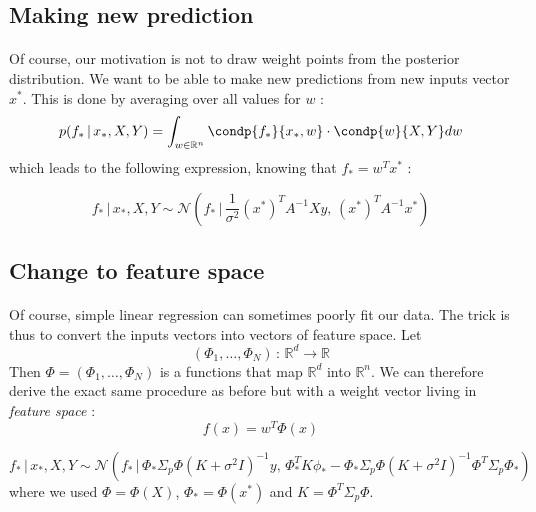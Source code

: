 \documentclass[a4paper]{article}
\begin{document}
{		\subsection{Making new prediction}
		{
			\paragraph{} Of course, our motivation is not to draw weight points from the posterior distribution. We want to be able to make new predictions from new inputs vector $x^*$. This is done by averaging over all values for $w$ : 
			\begin{equation}
				p(f_*\, \vert \, x_*,X,Y) = \int_{w\in\mathbb{R}^n} \condp{f_*}{x_*, w}\cdot \condp{w}{X,Y}dw
			\end{equation}
			which leads to the following expression, knowing that $f_* = w^Tx^*$ : 
			\vspace{10pt}
			
			{
				$$f_*\, \vert \, x_*,X,Y \sim \mathcal{N}\left(f_*\, \Big| \,  \frac{1}{\sigma^2}(x^*)^TA^{-1}Xy, \,(x^*)^TA^{-1}x^*\right)$$
			}
		}
		
		\subsection{Change to feature space}
		{
			\paragraph{} Of course, simple linear regression can sometimes poorly fit our data. The trick is thus to convert the inputs vectors into vectors of feature space. Let 
			\begin{equation}
				(\Phi_1, \hdots, \Phi_N) \, : \, \mathbb{R}^d \to \mathbb{R}
			\end{equation}
			Then $\Phi = (\Phi_1, \hdots, \Phi_N)$ is a functions that map $\mathbb{R}^d$ into $\mathbb{R}^n$. We can therefore derive the exact same procedure as before but with a weight vector living in \emph{feature space} : 
			\begin{equation}
				f(x) = w^T\Phi(x)
			\end{equation}
			
			{
				$$f_*\, \vert \, x_*,X,Y \sim \mathcal{N}\left(f_*\, \Big| \, \Phi_*\Sigma_p\Phi(K+\sigma^2I)^{-1}y, \, \Phi_*^TK\phi_* - \Phi_*\Sigma_p\Phi(K+\sigma^2I)^{-1}\Phi^T\Sigma_p\Phi_*\right)$$
				where we used $\Phi = \Phi(X)$, $\Phi_* = \Phi(x^*)$ and $K = \Phi^T\Sigma_p\Phi$.
			}
			
}}
\end{document}
